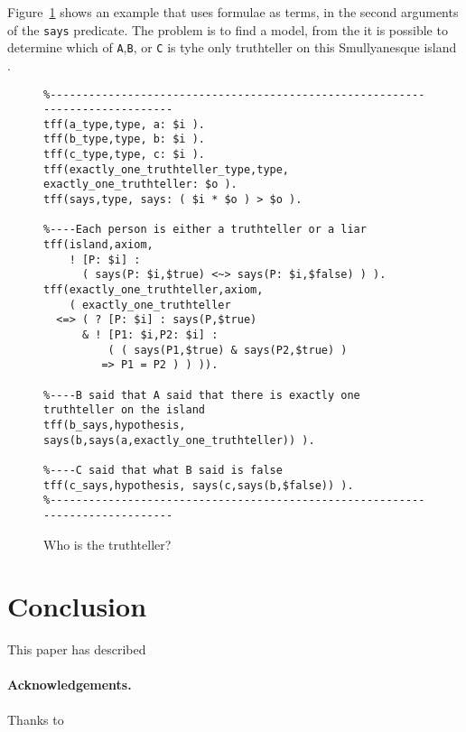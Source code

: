 \documentclass{easychair}
\begin{document}
Figure~\ref{Truthteller} shows an example that uses formulae as terms, in
the second arguments of the {\tt says} predicate.
The problem is to find a model, from the it is possible to determine which
of {\tt A},{\tt B}, or {\tt C} is tyhe only truthteller on this
Smullyanesque island \cite{Smu78}.

\begin{figure}[htbp]
\begin{small}
\begin{verbatim}
%------------------------------------------------------------------------------
tff(a_type,type, a: $i ).
tff(b_type,type, b: $i ).
tff(c_type,type, c: $i ).
tff(exactly_one_truthteller_type,type, exactly_one_truthteller: $o ).
tff(says,type, says: ( $i * $o ) > $o ).

%----Each person is either a truthteller or a liar
tff(island,axiom,
    ! [P: $i] :
      ( says(P: $i,$true) <~> says(P: $i,$false) ) ).
tff(exactly_one_truthteller,axiom,
    ( exactly_one_truthteller
  <=> ( ? [P: $i] : says(P,$true)
      & ! [P1: $i,P2: $i] :
          ( ( says(P1,$true) & says(P2,$true) )
         => P1 = P2 ) ) )).

%----B said that A said that there is exactly one truthteller on the island
tff(b_says,hypothesis, says(b,says(a,exactly_one_truthteller)) ).

%----C said that what B said is false
tff(c_says,hypothesis, says(c,says(b,$false)) ).
%------------------------------------------------------------------------------
\end{verbatim}
\end{small}
\caption{Who is the truthteller?}
\label{Truthteller}
\end{figure}

\section{Conclusion}
\label{Conclusion}

This paper has described 

\paragraph{Acknowledgements.}
Thanks to 



\end{document}

